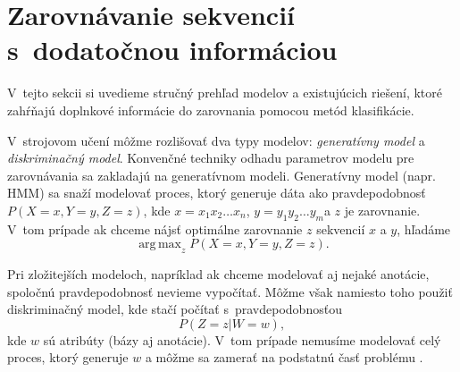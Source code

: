 \section[Zarov. s~dodat. info.]{Zarovnávanie sekvencií s~dodatočnou informáciou}
\label{section:other-work}

V~tejto sekcii si uvedieme stručný prehľad modelov a existujúcich riešení, ktoré zahŕňajú doplnkové informácie do zarovnania pomocou metód klasifikácie.

V~strojovom učení môžme rozlišovať dva typy modelov: \textit{generatívny model} a \textit{diskriminačný model}.
Konvenčné techniky odhadu parametrov modelu pre zarovnávania sa zakladajú na generatívnom modeli. Generatívny model (napr. HMM) sa snaží modelovať proces, ktorý generuje dáta ako pravdepodobnosť $P(X=x,Y=y,Z=z)$, kde $x = x_1x_2\dots x_n$, $y = y_1y_2\dots y_m$a $z$ je zarovnanie. V~tom prípade ak chceme nájsť optimálne zarovnanie $z$ sekvencií $x$ a $y$, hľadáme
$$\operatorname{ arg\,max}_z P(X = x,Y = y,Z = z).$$

Pri zložitejších modeloch, napríklad ak chceme modelovať aj nejaké anotácie, spoločnú pravdepodobnosť nevieme vypočítať.
Môžme však namiesto toho použiť diskriminačný model, kde stačí počítať s~pravdepodobnosťou
$$P(Z=z|W=w),$$ kde $w$ sú atribúty (bázy aj anotácie). V~tom prípade nemusíme modelovať celý proces, ktorý generuje $w$ a môžme sa zamerať na podstatnú časť problému \cite{svmTrainingProteinsAlignment}.



